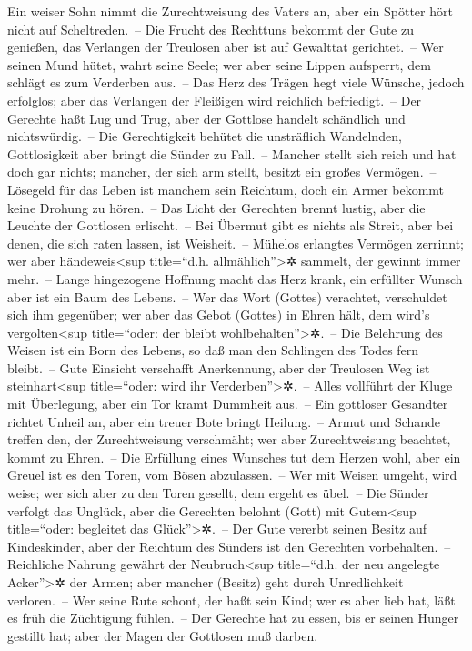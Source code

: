Ein weiser Sohn nimmt die Zurechtweisung des Vaters an,
aber ein Spötter hört nicht auf Scheltreden.~-- Die Frucht
des Rechttuns bekommt der Gute zu genießen, das Verlangen der Treulosen
aber ist auf Gewalttat gerichtet.~-- Wer seinen Mund
hütet, wahrt seine Seele; wer aber seine Lippen aufsperrt, dem schlägt
es zum Verderben aus.~-- Das Herz des Trägen hegt viele
Wünsche, jedoch erfolglos; aber das Verlangen der Fleißigen wird
reichlich befriedigt.~-- Der Gerechte haßt Lug und Trug,
aber der Gottlose handelt schändlich und nichtswürdig.~--
Die Gerechtigkeit behütet die unsträflich Wandelnden,
Gottlosigkeit aber bringt die Sünder zu Fall.~-- Mancher
stellt sich reich und hat doch gar nichts; mancher, der sich arm stellt,
besitzt ein großes Vermögen.~-- Lösegeld für das Leben ist
manchem sein Reichtum, doch ein Armer bekommt keine Drohung zu hören.~--
Das Licht der Gerechten brennt lustig, aber die Leuchte
der Gottlosen erlischt.~-- Bei Übermut gibt es nichts als
Streit, aber bei denen, die sich raten lassen, ist Weisheit.~--
Mühelos erlangtes Vermögen zerrinnt; wer aber
händeweis\textless sup title=``d.h. allmählich''\textgreater✲ sammelt,
der gewinnt immer mehr.~-- Lange hingezogene Hoffnung
macht das Herz krank, ein erfüllter Wunsch aber ist ein Baum des
Lebens.~-- Wer das Wort (Gottes) verachtet, verschuldet
sich ihm gegenüber; wer aber das Gebot (Gottes) in Ehren hält, dem
wird's vergolten\textless sup title=``oder: der bleibt
wohlbehalten''\textgreater✲.~-- Die Belehrung des Weisen
ist ein Born des Lebens, so daß man den Schlingen des Todes fern
bleibt.~-- Gute Einsicht verschafft Anerkennung, aber der
Treulosen Weg ist steinhart\textless sup title=``oder: wird ihr
Verderben''\textgreater✲.~-- Alles vollführt der Kluge
mit Überlegung, aber ein Tor kramt Dummheit aus.~-- Ein
gottloser Gesandter richtet Unheil an, aber ein treuer Bote bringt
Heilung.~-- Armut und Schande treffen den, der
Zurechtweisung verschmäht; wer aber Zurechtweisung beachtet, kommt zu
Ehren.~-- Die Erfüllung eines Wunsches tut dem Herzen
wohl, aber ein Greuel ist es den Toren, vom Bösen abzulassen.~--
Wer mit Weisen umgeht, wird weise; wer sich aber zu den
Toren gesellt, dem ergeht es übel.~-- Die Sünder verfolgt
das Unglück, aber die Gerechten belohnt (Gott) mit Gutem\textless sup
title=``oder: begleitet das Glück''\textgreater✲.~-- Der
Gute vererbt seinen Besitz auf Kindeskinder, aber der Reichtum des
Sünders ist den Gerechten vorbehalten.~-- Reichliche
Nahrung gewährt der Neubruch\textless sup title=``d.h. der neu angelegte
Acker''\textgreater✲ der Armen; aber mancher (Besitz) geht durch
Unredlichkeit verloren.~-- Wer seine Rute schont, der
haßt sein Kind; wer es aber lieb hat, läßt es früh die Züchtigung
fühlen.~-- Der Gerechte hat zu essen, bis er seinen
Hunger gestillt hat; aber der Magen der Gottlosen muß darben.

